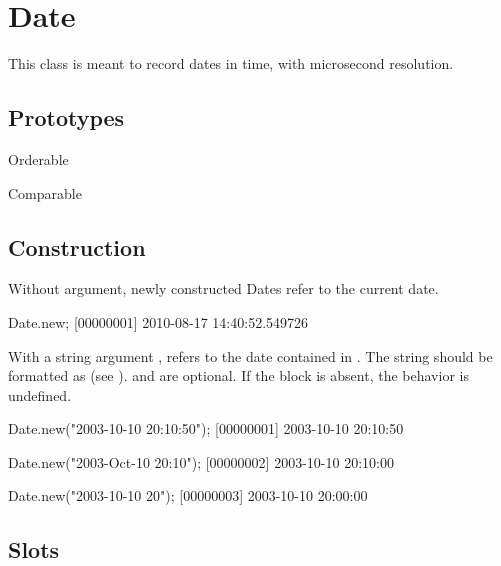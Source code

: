 
\section{Date}

This class is meant to record dates in time, with microsecond resolution.
\experimental{}

\subsection{Prototypes}
\begin{refObjects}
\item[Orderable]
\item[Comparable]
\end{refObjects}

\subsection{Construction}

Without argument, newly constructed Dates refer to the current date.

\begin{urbiunchecked}[firstnumber=1]
Date.new;
[00000001] 2010-08-17 14:40:52.549726
\end{urbiunchecked}

With a string argument , refers to the date contained in .
The string should be formatted as  (see ). 
and  are optional. If the block 
is absent, the behavior is undefined.


\begin{urbiscript}
Date.new("2003-10-10 20:10:50");
[00000001] 2003-10-10 20:10:50

Date.new("2003-Oct-10 20:10");
[00000002] 2003-10-10 20:10:00

Date.new("2003-10-10 20");
[00000003] 2003-10-10 20:00:00
\end{urbiscript}

\subsection{Slots}

